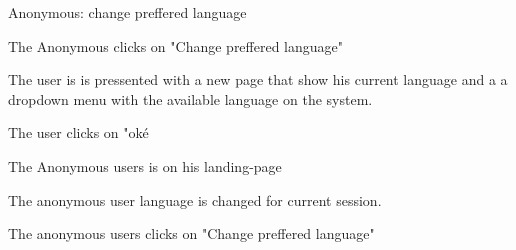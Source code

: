 \begin{uc}{Anonymous: change preffered language}

    \begin{uc-mss}
    \item The Anonymous clicks on "Change preffered language"
    \item The user is is pressented with a new page that show his current language and a a dropdown menu with the available language on the system.
    \item The user clicks on "oké 
    \end{uc-mss}
        \begin{uc-pre}
        \item The Anonymous users is on his landing-page
        \end{uc-pre}

        \begin{uc-post}
        \item The anonymous user language is changed for current session.
        \end{uc-post}

        \begin{uc-trig}
            The anonymous users clicks on "Change preffered language"
        \end{uc-trig}
\end{uc}
